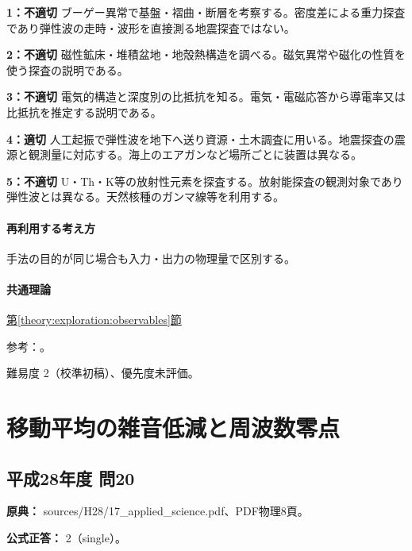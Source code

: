 \noindent\textbf{1：不適切} ブーゲー異常で基盤・褶曲・断層を考察する。密度差による重力探査であり弾性波の走時・波形を直接測る地震探査ではない。\par

\noindent\textbf{2：不適切} 磁性鉱床・堆積盆地・地殻熱構造を調べる。磁気異常や磁化の性質を使う探査の説明である。\par

\noindent\textbf{3：不適切} 電気的構造と深度別の比抵抗を知る。電気・電磁応答から導電率又は比抵抗を推定する説明である。\par

\noindent\textbf{4：適切} 人工起振で弾性波を地下へ送り資源・土木調査に用いる。地震探査の震源と観測量に対応する。海上のエアガンなど場所ごとに装置は異なる。\par

\noindent\textbf{5：不適切} U・Th・K等の放射性元素を探査する。放射能探査の観測対象であり弾性波とは異なる。天然核種のガンマ線等を利用する。\par

\paragraph{再利用する考え方} 手法の目的が同じ場合も入力・出力の物理量で区別する。

\paragraph{共通理論} \hyperref[theory:exploration:observables]{第\ref*{theory:exploration:observables}節}

\par 参考：\cite{epa_seismic_reflection,segj_integrated2017}。

\par 難易度 2（校準初稿）、優先度未評価。

\section{移動平均の雑音低減と周波数零点}

\subsection{平成28年度 問20}
\label{q:h28-reg-applied-20}

\noindent\textbf{原典：} sources/H28/17\_applied\_science.pdf、PDF物理8頁。

\textbf{公式正答：} 2（single）。

